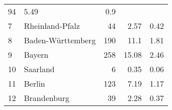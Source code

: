 \begin{longtable}{lXrrr}
       \num{94} &
       \num[round-mode=places,round-precision=2]{5,49} &
         \num[round-mode=places,round-precision=2]{0,9} \\

     7 &
     \multicolumn{1}{X}{ Rheinland-Pfalz   } &


       \num{44} &
       \num[round-mode=places,round-precision=2]{2,57} &
         \num[round-mode=places,round-precision=2]{0,42} \\

     8 &
     \multicolumn{1}{X}{ Baden-Württemberg   } &


       \num{190} &
       \num[round-mode=places,round-precision=2]{11,1} &
         \num[round-mode=places,round-precision=2]{1,81} \\

     9 &
     \multicolumn{1}{X}{ Bayern   } &


       \num{258} &
       \num[round-mode=places,round-precision=2]{15,08} &
         \num[round-mode=places,round-precision=2]{2,46} \\

     10 &
     \multicolumn{1}{X}{ Saarland   } &


       \num{6} &
       \num[round-mode=places,round-precision=2]{0,35} &
         \num[round-mode=places,round-precision=2]{0,06} \\

     11 &
     \multicolumn{1}{X}{ Berlin   } &


       \num{123} &
       \num[round-mode=places,round-precision=2]{7,19} &
         \num[round-mode=places,round-precision=2]{1,17} \\

     12 &
     \multicolumn{1}{X}{ Brandenburg   } &


       \num{39} &
       \num[round-mode=places,round-precision=2]{2,28} &
         \num[round-mode=places,round-precision=2]{0,37} \\


\end{longtable}
